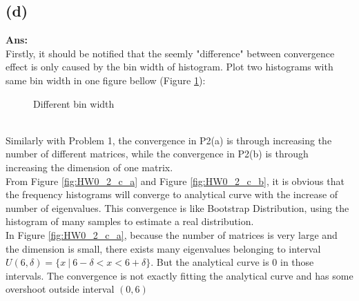 \documentclass[twoside]{homework}
\begin{document}
\subsection*{(d)}
\textbf{Ans:}\\
Firstly, it should be notified that the seemly "difference" between convergence effect is only caused by the bin width of histogram. Plot two histograms with same bin width in one figure bellow (Figure \ref{fig:HW0_2_d}):\\
\begin{figure}[!h]
\centering
{}
\caption{Different bin width}
\label{fig:HW0_2_d}
\end{figure}\\
Similarly with Problem 1, the convergence in P2(a) is through increasing the number of different matrices, while the convergence in P2(b) is through increasing the dimension of one matrix. \\
From Figure \ref{fig:HW0_2_c_a} and Figure \ref{fig:HW0_2_c_b}, it is obvious that the frequency histograms will converge to analytical curve with the increase of number of eigenvalues. This convergence is like Bootstrap Distribution, using the histogram of many samples to estimate a real distribution. \\
In Figure \ref{fig:HW0_2_c_a}, because the number of matrices is very large and the dimension is small, there exists many eigenvalues belonging to interval $U(6,\delta)=\{x\ |\ 6-\delta<x<6+\delta\}$. But the analytical curve is 0 in those intervals. The convergence is not exactly fitting the analytical curve and has some overshoot outside interval $(0,6)$\\
\end{document}
